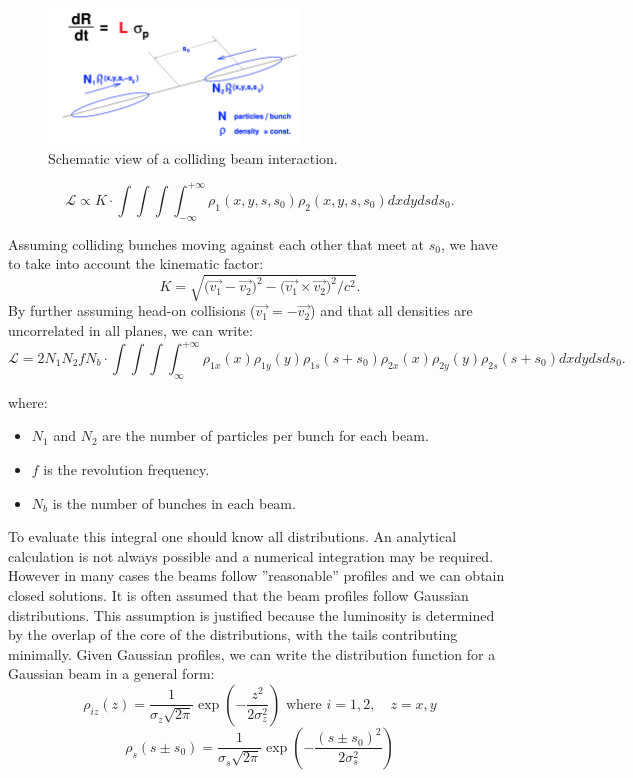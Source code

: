 \begin{figure}
    \centering
    \includegraphics[width=0.6\textwidth]{figures/luminosity_def.png}
    \caption{Schematic view of a colliding beam interaction.}
    \label{fig:lumi-def}
\end{figure}

\begin{equation}
    \mathcal{L} \propto K\cdot\int\int\int\int_{-\infty}^{+\infty}\rho_1(x,y,s,s_0)\rho_2(x,y,s,s_0)dxdydsds_0.
\end{equation}

Assuming colliding bunches moving against each other that meet at $s_0$, we have to take into account the kinematic factor\cite{Moller}:
\begin{equation}
    K = \sqrt{\bigl(\vec{v_1}-\vec{v_2}\bigr)^2-\bigl(\vec{v_1} \times \vec{v_2}\bigr)^2/c^2}.
\end{equation}
By further assuming head-on collisions ($\vec{v_1}=-\vec{v_2}$) and that all densities are uncorrelated in all planes, we can write:
\begin{equation}
        \mathcal{L} = 2 N_1 N_2 f N_b\cdot\int\int\int\int_{\infty}^{+\infty}\rho_{1x}(x)\rho_{1y}(y)\rho_{1s}(s+s_0)\rho_{2x}(x)\rho_{2y}(y)\rho_{2s}(s+s_0)dxdydsds_0.\label{beam_overlap}
\end{equation}

where:
\begin{itemize}
    \item \( N_1 \) and \( N_2 \) are the number of particles per bunch for each beam.
    \item \( f \) is the revolution frequency.
    \item \( N_b \) is the number of bunches in each beam.
\end{itemize}

To evaluate this integral one should know all distributions. An analytical calculation is not always possible and a numerical integration may be required. However in many cases the beams follow ”reasonable” profiles and we can obtain closed solutions. It is often assumed that the beam profiles follow Gaussian distributions. This assumption is justified because the luminosity is determined by the overlap of the core of the distributions, with the tails contributing minimally.
Given Gaussian profiles, we can write the distribution function for a Gaussian beam in a general form:
\begin{equation}
\rho_{iz}(z) =\frac{1}{\sigma_z\sqrt{2\pi}} \exp\left( -\frac{z^2}{2 \sigma_z^2} \right) \text{ where } i=1,2, \quad z=x,y
\end{equation}
\begin{equation}
\rho_{s}(s\pm s_0) =\frac{1}{\sigma_s\sqrt{2\pi}} \exp\left( -\frac{(s\pm s_0)^2}{2 \sigma_s^2} \right)
\end{equation}

